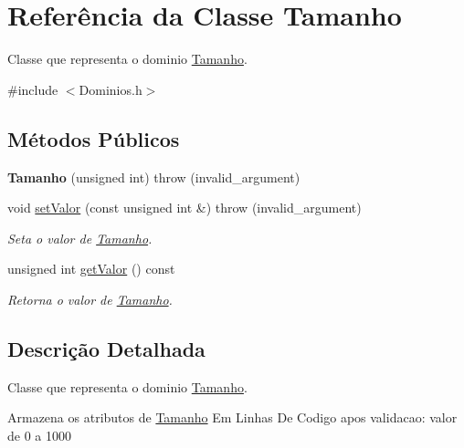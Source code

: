 \hypertarget{class_tamanho}{
\section{\-Referência da \-Classe \-Tamanho}
\label{class_tamanho}
}


\-Classe que representa o dominio \hyperlink{class_tamanho}{\-Tamanho}.  




{\ttfamily \#include $<$\-Dominios.\-h$>$}

\subsection*{\-Métodos \-Públicos}
\begin{DoxyCompactItemize}
\item 
\hypertarget{class_tamanho_a63541f3ebe1209729030e17b6a21236c}{
{\bfseries \-Tamanho} (unsigned int)  throw (invalid\-\_\-argument)}
\label{class_tamanho_a63541f3ebe1209729030e17b6a21236c}

\item 
void \hyperlink{class_tamanho_afb80c548279d5baa4f0ef163f7f564d0}{set\-Valor} (const unsigned int \&)  throw (invalid\-\_\-argument)
\begin{DoxyCompactList}\small\item\em \-Seta o valor de \hyperlink{class_tamanho}{\-Tamanho}. \end{DoxyCompactList}\item 
unsigned int \hyperlink{class_tamanho_a0150e086c4b3d37b9d98e34c34532a10}{get\-Valor} () const 
\begin{DoxyCompactList}\small\item\em \-Retorna o valor de \hyperlink{class_tamanho}{\-Tamanho}. \end{DoxyCompactList}\end{DoxyCompactItemize}


\subsection{\-Descrição \-Detalhada}
\-Classe que representa o dominio \hyperlink{class_tamanho}{\-Tamanho}. 

\-Armazena os atributos de \hyperlink{class_tamanho}{\-Tamanho} \-Em \-Linhas \-De \-Codigo apos validacao\-: valor de 0 a 1000 

